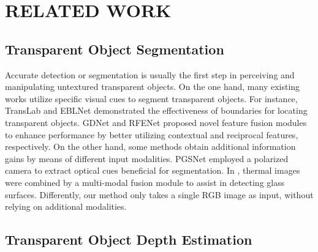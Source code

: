 \section{RELATED WORK}
\subsection{Transparent Object Segmentation}

Accurate detection or segmentation is usually the first step in perceiving and manipulating untextured transparent objects. On the one hand, many existing works utilize specific visual cues to segment transparent objects. For instance, TransLab \cite{c3} and EBLNet \cite{c4} demonstrated the effectiveness of boundaries for locating transparent objects. GDNet \cite{c21} and RFENet \cite{c22} proposed novel feature fusion modules to enhance performance by better utilizing contextual and reciprocal features, respectively. On the other hand, some methods obtain additional information gains by means of different input modalities. PGSNet \cite{c5} employed a polarized camera to extract optical cues beneficial for segmentation. In \cite{c6}, thermal images were combined by a multi-modal fusion module to assist in detecting glass surfaces. Differently, our method only takes a single RGB image as input, without relying on additional modalities.

\subsection{Transparent Object Depth Estimation}

